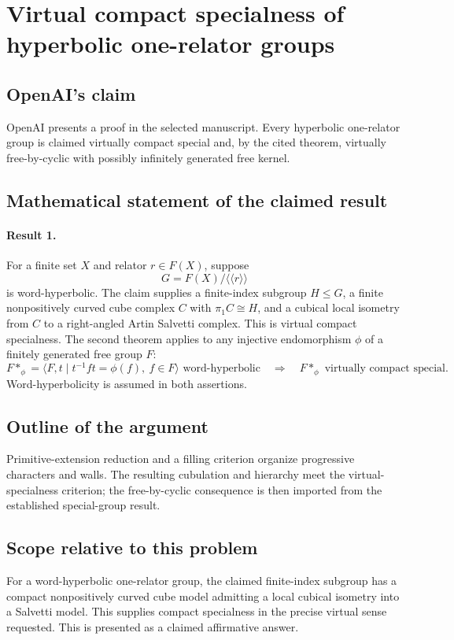 \documentclass[11pt]{article}
\begin{document}
\section*{Virtual compact specialness of hyperbolic one-relator groups}

\subsection{OpenAI's claim}
OpenAI presents a proof in the selected manuscript. Every hyperbolic one-relator group is claimed virtually compact special and, by the cited theorem, virtually free-by-cyclic with possibly infinitely generated free kernel.

\subsection{Mathematical statement of the claimed result}
\paragraph{Result 1.} For a finite set \(X\) and relator \(r\in F(X)\), suppose
\[
 G=F(X)/\langle\!\langle r\rangle\!\rangle
\]
is word-hyperbolic. The claim supplies a finite-index subgroup \(H\le G\), a finite nonpositively curved cube complex \(C\) with \(\pi_1C\cong H\), and a cubical local isometry from \(C\) to a right-angled Artin Salvetti complex. This is virtual compact specialness. The second theorem applies to any injective endomorphism \(\phi\) of a finitely generated free group \(F\):
\[
 F*_{\phi}=\langle F,t\mid t^{-1}ft=\phi(f),\ f\in F\rangle
 \text{ word-hyperbolic}\quad\Longrightarrow\quad F*_{\phi}\text{ virtually compact special}.
\]
Word-hyperbolicity is assumed in both assertions.

\subsection{Outline of the argument}
Primitive-extension reduction and a filling criterion organize progressive characters and walls. The resulting cubulation and hierarchy meet the virtual-specialness criterion; the free-by-cyclic consequence is then imported from the established special-group result.

\subsection{Scope relative to this problem}
For a word-hyperbolic one-relator group, the claimed finite-index subgroup has a compact nonpositively curved cube model admitting a local cubical isometry into a Salvetti model. This supplies compact specialness in the precise virtual sense requested. This is presented as a claimed affirmative answer.
\end{document}
